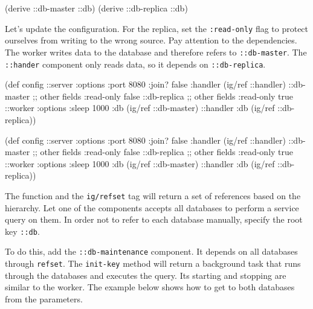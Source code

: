 \begin{english}
  \begin{clojure}
(derive ::db-master ::db)
(derive ::db-replica ::db)
  \end{clojure}
\end{english}

Let's update the configuration. For the replica, set the \verb|:read-only| flag to protect ourselves from writing to the wrong source. Pay attention to the dependencies. The worker writes data to the database and therefore refers to \verb|::db-master|. The \verb|::hander| component only reads data, so it depends on \verb|::db-replica|.

\ifnarrow

\begin{english}
  \begin{clojure}
(def config
  {::server {:options {:port 8080
                       :join? false}
             :handler (ig/ref ::handler)}
   ::db-master {;; other fields
                :read-only false}
   ::db-replica {;; other fields
                 :read-only true}
   ::worker {:options {:sleep 1000}
             :db (ig/ref ::db-master)}
   ::handler {:db (ig/ref
                    ::db-replica)}})
  \end{clojure}
\end{english}

\else

\begin{english}
  \begin{clojure}
(def config
  {::server {:options {:port 8080 :join? false}
             :handler (ig/ref ::handler)}
   ::db-master {;; other fields
                :read-only false}
   ::db-replica {;; other fields
                 :read-only true}
   ::worker {:options {:sleep 1000}
             :db (ig/ref ::db-master)}
   ::handler {:db (ig/ref ::db-replica)}})
  \end{clojure}
\end{english}

\fi

The function and the \verb|ig/refset| tag will return a set of references based on the hierarchy. Let one of the components accepts all databases to perform a service query on them. In order not to refer to each database manually, specify the root key \verb|::db|.

To do this, add the \texttt{::db-main\-te\-nance} component. It depends on all databases through \verb|refset|. The \verb|init-key| method will return a background task that runs through the databases and executes the query. Its starting and stopping are similar to the worker. The example below shows how to get to both databases from the parameters.

